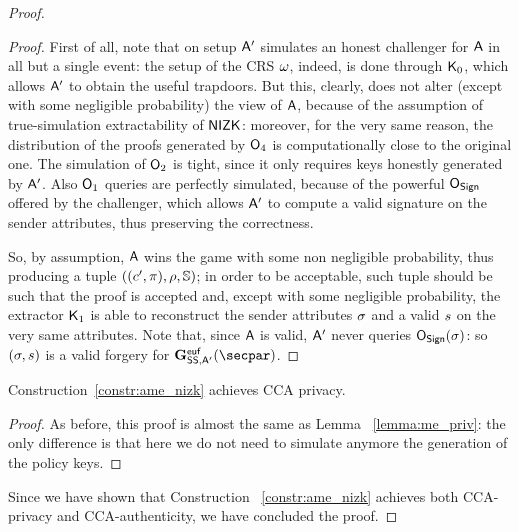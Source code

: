 \begin{theorem}
\begin{proof}
\begin{lemma}
\begin{proof}
                First of all, note that on setup $\mathsf{A}'$ simulates an honest challenger for $\mathsf{A}$ in all but a single event: the setup of the CRS $\omega$, indeed, is done through $\mathsf{K}_0$, which allows $\mathsf{A}'$ to obtain the useful trapdoors. But this, clearly, does not alter (except with some negligible probability) the view of $\mathsf{A}$, because of the assumption of true-simulation extractability of $\mathsf{NIZK}$: moreover, for the very same reason, the distribution of the proofs generated by $\mathsf{O}_4$ is computationally close to the original one.
                The simulation of $\mathsf{O}_2$ is tight, since it only requires keys honestly generated by $\mathsf{A}'$.
                Also $\mathsf{O}_1$ queries are perfectly simulated, because of the powerful $\mathsf{O}_{\mathsf{Sign}}$ offered by the challenger, which allows $\mathsf{A}'$ to compute a valid signature on the sender attributes, thus preserving the correctness.

                So, by assumption, $\mathsf{A}$ wins the game with some non negligible probability, thus producing a tuple $((c', \pi), \rho, \mathbb{S})$; in order to be acceptable, such tuple should be such that the proof is accepted and, except with some negligible probability, the extractor $\mathsf{K}_1$ is able to reconstruct the sender attributes $\sigma$ and a valid $s$ on the very same attributes.
                Note that, since $\mathsf{A}$ is valid, $\mathsf{A}'$ never queries $\mathsf{O}_{\mathsf{Sign}}(\sigma)$: so $(\sigma, s)$ is a valid forgery for $\Sigeufgame_{\sig, \adversary'}(\secpar)$.
            \end{proof}
        \end{lemma}

        \begin{lemma}\label{lemma:ame_priv}
            Construction~\ref{constr:ame_nizk} achieves CCA privacy.
            \begin{proof}
                As before, this proof is almost the same as Lemma ~\ref{lemma:me_priv}: the only difference is that here we do not need to simulate anymore the generation of the policy keys.
            \end{proof}
        \end{lemma}
        Since we have shown that Construction ~\ref{constr:ame_nizk} achieves both CCA-privacy and CCA-authenticity, we have concluded the proof.
    \end{proof}
\end{theorem}